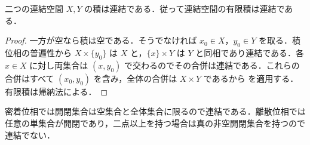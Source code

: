 \begin{prop}[連結空間の有限積]
二つの連結空間 $X,Y$ の積は連結である．従って連結空間の有限積は連結である．
\end{prop}
\begin{proof}
一方が空なら積は空である．そうでなければ $x_0\in X$，$y_0\in Y$ を取る．積位相の普遍性から $X\times\{y_0\}$ は $X$ と，$\{x\}\times Y$ は $Y$ と同相であり連結である．各 $x\in X$ に対し両集合は $(x,y_0)$ で交わるのでその合併は連結である．これらの合併はすべて $(x_0,y_0)$ を含み，全体の合併は $X\times Y$ であるから  を適用する．有限積は帰納法による．
\end{proof}
\begin{prop}[密着空間と離散空間の連結性]
密着位相では開閉集合は空集合と全体集合に限るので連結である．離散位相では任意の単集合が開閉であり，二点以上を持つ場合は真の非空開閉集合を持つので連結でない．
\end{prop}
